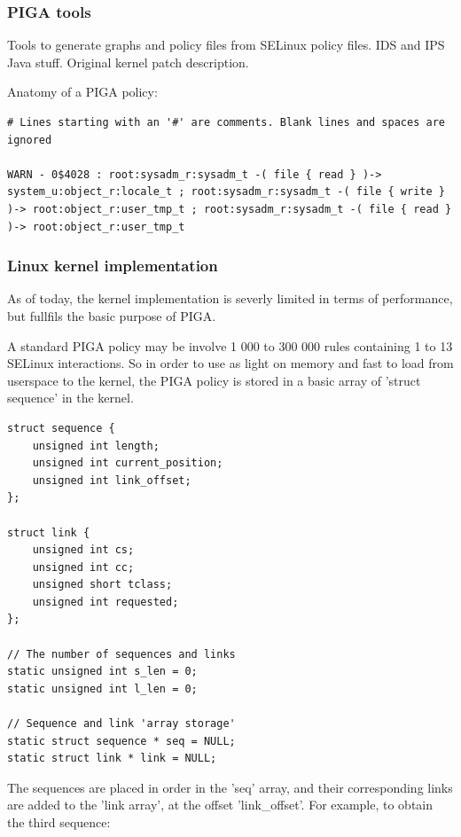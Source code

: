 \documentclass[pdftex,a4paper,titlepage,11pt]{article}
\begin{document}
\subsubsection{PIGA tools}

Tools to generate graphs and policy files from SELinux policy files. IDS and IPS Java stuff. Original kernel patch description.

Anatomy of a PIGA policy:

\begin{lstlisting}
# Lines starting with an '#' are comments. Blank lines and spaces are ignored

WARN - 0$4028 : root:sysadm_r:sysadm_t -( file { read } )-> system_u:object_r:locale_t ; root:sysadm_r:sysadm_t -( file { write } )-> root:object_r:user_tmp_t ; root:sysadm_r:sysadm_t -( file { read } )-> root:object_r:user_tmp_t
\end{lstlisting}


\subsubsection{Linux kernel implementation}

As of today, the kernel implementation is severly limited in terms of performance, but fullfils the basic purpose of PIGA.

\bigskip

A standard PIGA policy may be involve 1 000 to 300 000 rules containing 1 to 13 SELinux interactions. So in order to use as light on memory and fast to load from userspace to the kernel, the PIGA policy is stored in a basic array of 'struct sequence' in the kernel.

\begin{lstlisting}
struct sequence {
	unsigned int length;
	unsigned int current_position;
	unsigned int link_offset;
};

struct link {
	unsigned int cs;
	unsigned int cc;
	unsigned short tclass;
	unsigned int requested;
};

// The number of sequences and links
static unsigned int s_len = 0;
static unsigned int l_len = 0;

// Sequence and link 'array storage'
static struct sequence * seq = NULL;
static struct link * link = NULL;
\end{lstlisting}

\smallskip

The sequences are placed in order in the 'seq' array, and their corresponding links are added to the 'link array', at the offset 'link\_offset'. For example, to obtain the third sequence:
\end{document}
